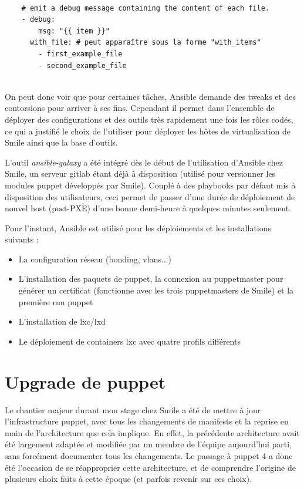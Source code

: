 \documentclass[14 pt]{extreport}
\begin{document}
\begin{framed}
\begin{Verbatim}[fontsize=\scriptsize]

    # emit a debug message containing the content of each file.
    - debug:
        msg: "{{ item }}"
      with_file: # peut apparaître sous la forme "with_items"
        - first_example_file
        - second_example_file
        
\end{Verbatim}
\end{framed}

On peut donc voir que pour certaines tâches, Ansible demande des tweaks et des contorsions pour arriver à ses fins. Cependant il permet dans l'ensemble de déployer des configurations et des outils très rapidement une fois les rôles codés, ce qui a justifié le choix de l'utiliser pour déployer les hôtes de virtualisation de Smile ainsi que la base d'outils. 

L'outil \emph{ansible-galaxy} a été intégré dès le début de l'utilisation d'Ansible chez Smile, un serveur gitlab étant déjà à disposition (utilisé pour versionner les modules puppet développés par Smile). Couplé à des playbooks par défaut mis à disposition des utilisateurs, ceci permet de passer d'une durée de déploiement de nouvel host (post-PXE) d'une bonne demi-heure à quelques minutes seulement.

Pour l'instant, Ansible est utilisé pour les déploiements et les installations suivants :

\begin{itemize}
	\item La configuration réseau (bonding, vlans...)
	\item L'installation des paquets de puppet, la connexion au puppetmaster pour générer un certificat (fonctionne avec les trois puppetmasters de Smile) et la première run puppet
	\item L'installation de lxc/lxd
	\item Le déploiement de containers lxc avec quatre profils différents
\end{itemize}

\section{Upgrade de puppet}

Le chantier majeur durant mon stage chez Smile a été de mettre à jour l'infrastructure puppet, avec tous les changements de manifests et la reprise en main de l'architecture que cela implique. En effet, la précédente architecture avait été largement adaptée et modifiée par un membre de l'équipe aujourd'hui parti, sans forcément documenter tous les changements. Le passage à puppet 4 a donc été l'occasion de se réapproprier cette architecture, et de comprendre l'origine de plusieurs choix faits à cette époque (et parfois revenir sur ces choix).
\end{document}
